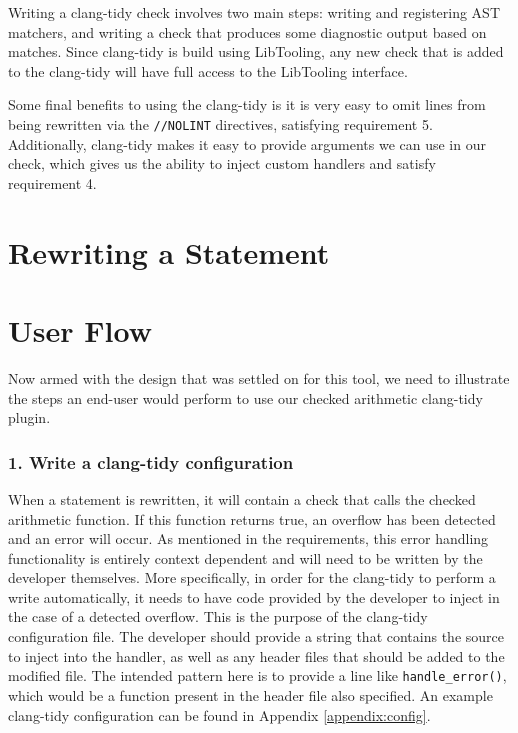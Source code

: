 Writing a clang-tidy check involves two main steps: writing and registering AST matchers, and writing a check that produces some diagnostic output based on matches. Since clang-tidy is build using LibTooling, any new check that is added to the clang-tidy will have full access to the LibTooling interface.

Some final benefits to using the clang-tidy is it is very easy to omit lines from being rewritten via the \texttt{//NOLINT} directives, satisfying requirement 5. Additionally, clang-tidy makes it easy to provide arguments we can use in our check, which gives us the ability to inject custom handlers and satisfy requirement 4.

\section{Rewriting a Statement}

\section{User Flow}

Now armed with the design that was settled on for this tool, we need to illustrate the steps an end-user would perform to use our checked arithmetic clang-tidy plugin.

\subsubsection{1. Write a clang-tidy configuration}

When a statement is rewritten, it will contain a check that calls the checked arithmetic function. If this function returns true, an overflow has been detected and an error will occur. As mentioned in the requirements, this error handling functionality is entirely context dependent and will need to be written by the developer themselves. More specifically, in order for the clang-tidy to perform a write automatically, it needs to have code provided by the developer to inject in the case of a detected overflow. This is the purpose of the clang-tidy configuration file. The developer should provide a string that contains the source to inject into the handler, as well as any header files that should be added to the modified file. The intended pattern here is to provide a line like \texttt{handle\_error()}, which would be a function present in the header file also specified. An example clang-tidy configuration can be found in Appendix \ref{appendix:config}.

